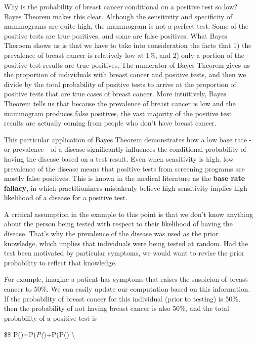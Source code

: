 \documentclass[
]{book}
\begin{document}
Why is the probability of breast cancer conditional on a positive test
so low? Bayes Theorem makes this clear. Although the sensitivity and
specificity of mammograms are quite high, the mammogram is not a perfect
test. Some of the positive tests are true positives, and some are false
positives. What Bayes Theroem shows us is that we have to take into
consideration the facts that 1) the prevalence of breast cancer is
relatively low at 1\%, and 2) only a portion of the positive test results
are true positives. The numerator of Bayes Theorem gives us the
proportion of individuals with breast cancer and positive tests, and
then we divide by the total probability of positive tests to arrive at
the proportion of positive tests that are true cases of breast cancer.
More intuitively, Bayes Theorem tells us that because the prevalence of
breast cancer is low and the mammogram produces false positives, the
vast majority of the positive test results are actually coming from
people who don't have breast cancer.

This particular application of Bayes Theorem demonstrates how a low base
rate - or prevalence - of a disease significantly influences the
conditional probability of having the disease based on a test result.
Even when sensitivity is high, low prevalence of the disease means that
positive tests from screening programs are mostly false positives. This
is known in the medical literature as the \textbf{base rate fallacy}, in
which practitioniners mistakenly believe high sensitivity implies high
likelihood of a disease for a positive test.

A critical assumption in the example to this point is that we don't know
anything about the person being tested with respect to their likelihood
of having the disease. That's why the prevalence of the disease was used
as the prior knowledge, which implies that individuals were being tested
at random. Had the test been motivated by particular symptoms, we would
want to revise the prior probability to reflect that knowledge.

For example, imagine a patient has symptoms that raises the suspicion of
breast cancer to 50\%. We can easily update our computation based on this
information. If the probability of breast cancer for this individual
(prior to testing) is 50\%, then the probability of not having breast
cancer is also 50\%, and the total probability of a positive test is

\$\$
P()=P(\emph{P(})+P(P()
\textbackslash{}
\end{document}
